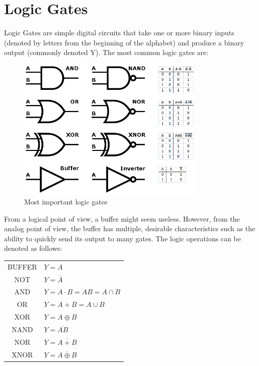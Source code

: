 \documentclass[a4paper]{report}
\begin{document}
\section{Logic Gates}

Logic Gates are simple digital circuits that take one or more binary inputs (denoted by letters from the beginning of the alphabet) and 
produce a binary output (commonly denoted Y). The most common logic gates are: \\

\begin{figure}[h]
    \centering
    \includegraphics[width=9cm]{gates.png}
    \caption{Most important logic gates}
\end{figure}

From a logical point of view, a buffer might seem useless. However, from the analog point of view, the buffer
has multiple, desirable characteristics such as the ability to quickly send its output to many gates. The logic operations can be denoted as follows:

\begin{center}
    \begin{tabular}{ c  l }
        BUFFER & $Y = A$  \\ 
        NOT & $Y = \overline{A}$  \\ 
        AND & $Y = A \cdot B = AB = A \cap  B$  \\ 
        OR & $Y = A + B = A \cup B $  \\ 
        XOR & $Y = A \oplus B$  \\ 
        NAND & $Y = \overline{AB}$  \\   
        NOR & $Y = \overline{A + B}$ \\
        XNOR & $Y = \overline{A \oplus B}$
    \end{tabular}
\end{center}
\end{document}
